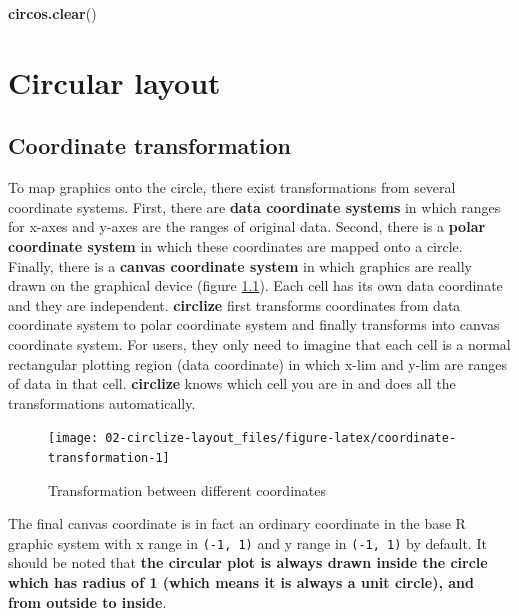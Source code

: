 \documentclass[]{book}
\newenvironment{Shaded}{\begin{snugshade}}{\end{snugshade}}
\newcommand{\KeywordTok}[1]{\textcolor[rgb]{0.13,0.29,0.53}{\textbf{#1}}}
\newcommand{\NormalTok}[1]{#1}
\theoremstyle{definition}
\theoremstyle{definition}
\theoremstyle{remark}
\begin{document}
\begin{Shaded}
\begin{Highlighting}[]
\KeywordTok{circos.clear}\NormalTok{()}
\end{Highlighting}
\end{Shaded}

\chapter{Circular layout}\label{circular-layout}

\section{Coordinate transformation}\label{coordinate-transformation}

To map graphics onto the circle, there exist transformations from
several coordinate systems. First, there are \textbf{data coordinate
systems} in which ranges for x-axes and y-axes are the ranges of
original data. Second, there is a \textbf{polar coordinate system} in
which these coordinates are mapped onto a circle. Finally, there is a
\textbf{canvas coordinate system} in which graphics are really drawn on
the graphical device (figure \ref{fig:coordinate-transformation}). Each
cell has its own data coordinate and they are independent.
\textbf{circlize} first transforms coordinates from data coordinate
system to polar coordinate system and finally transforms into canvas
coordinate system. For users, they only need to imagine that each cell
is a normal rectangular plotting region (data coordinate) in which x-lim
and y-lim are ranges of data in that cell. \textbf{circlize} knows which
cell you are in and does all the transformations automatically.

\begin{figure}

{\centering \texttt{[image: 02-circlize-layout\_files/figure-latex/coordinate-transformation-1]} 

}

\caption{Transformation between different coordinates}\label{fig:coordinate-transformation}
\end{figure}

The final canvas coordinate is in fact an ordinary coordinate in the
base R graphic system with x range in \texttt{(-1,\ 1)} and y range in
\texttt{(-1,\ 1)} by default. It should be noted that \textbf{the
circular plot is always drawn inside the circle which has radius of 1
(which means it is always a unit circle), and from outside to inside}.
\end{document}
